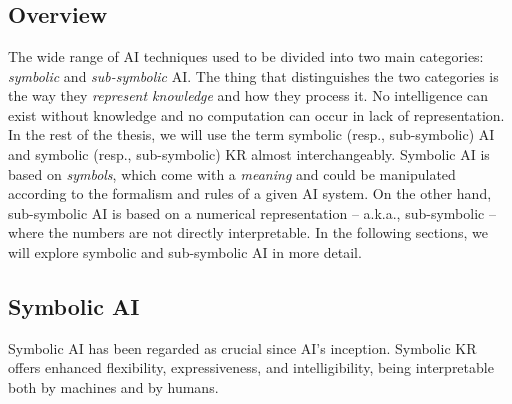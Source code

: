 
\chapter[Artificial Intelligence]{}
\label{ch:ai}
\minitoc

\section{Overview}\label{sec:ai-overview}
%
The wide range of \gls{AI} techniques used to be divided into two main categories: \emph{symbolic} and \emph{sub-symbolic} \gls{AI}.
%
The thing that distinguishes the two categories is the way they \emph{represent knowledge} and how they process it.
%
No intelligence can exist without knowledge and no computation can occur in lack of representation.
%
In the rest of the thesis, we will use the term symbolic (resp., sub-symbolic) \gls{AI} and symbolic (resp., sub-symbolic) \gls{KR} almost interchangeably.
%
Symbolic \gls{AI} is based on \emph{symbols}, which come with a \emph{meaning} and could be manipulated according to the formalism and rules of a given \gls{AI} system.
%
On the other hand, sub-symbolic \gls{AI} is based on a numerical representation -- a.k.a., sub-symbolic -- where the numbers are not directly interpretable.
%
%
In the following sections, we will explore symbolic and sub-symbolic \gls{AI} in more detail.


\section{Symbolic \Gls{AI}}\label{sec:symbolic-ai}
%
Symbolic \gls{AI} has been regarded as crucial since \gls{AI}'s inception.
%
Symbolic \gls{KR} offers enhanced flexibility, expressiveness, and intelligibility, being interpretable both by machines and by humans.

